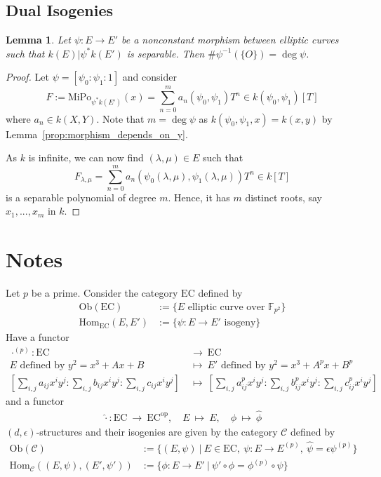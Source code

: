 \documentclass{scrartcl}
\newcommand{\F}{\mathbb{F}}
\renewcommand{\O}{O}
\newtheorem{lemma}[prop]{Lemma}
\theoremstyle{definition}
\begin{document}
\subsection{Dual Isogenies}
\begin{lemma}
    Let $\psi: E \to E'$ be a nonconstant morphism between elliptic curves such that $k(E) | \psi^*k(E')$ is separable.
    Then $\#\psi^{-1}(\{\O\}) = \deg\psi$.
\end{lemma}
\begin{proof}
    Let $\psi = [\psi_0 : \psi_1 : 1]$ and consider
    \begin{equation*}
        F := \mathrm{MiPo}_{\psi^*k(E')}(x) = \sum_{n = 0}^m a_n(\psi_0, \psi_1) T^n \in k(\psi_0, \psi_1)[T]
    \end{equation*}
    where $a_n \in k(X, Y)$.
    Note that $m = \deg\psi$ as $k(\psi_0, \psi_1, x) = k(x, y)$ by Lemma~\ref{prop:morphism_depends_on_y}.

    As $k$ is infinite, we can now find $(\lambda, \mu) \in E$ such that
    \begin{equation*}
        F_{\lambda, \mu} = \sum_{n = 0}^m a_n(\psi_0(\lambda, \mu), \psi_1(\lambda, \mu)) T^n \in k[T]
    \end{equation*}
    is a separable polynomial of degree $m$.
    Hence, it has $m$ distinct roots, say $x_1, ..., x_m$ in $k$.
\end{proof}

\section*{Notes}
Let $p$ be a prime.
Consider the category $\mathrm{EC}$ defined by
\begin{align*}
    \mathrm{Ob}(\mathrm{EC}) &:= \{ \text{$E$ elliptic curve over $\F_{p^2}$} \} \\
    \mathrm{Hom}_{\mathrm{EC}}(E, E') &:= \{ \text{$\psi: E \to E'$ isogeny} \}
\end{align*}
Have a functor
\begin{align*}
    \cdot^{(p)}: \mathrm{EC} \ &\to \ \mathrm{EC} \\
    \text{$E$ defined by $y^2 = x^3 + Ax + B$} \ &\mapsto \ \text{$E'$ defined by $y^2 = x^3 + A^p x + B^p$} \\
    \left[ \sum_{i, j} a_{ij} x^i y^j : \sum_{i, j} b_{ij} x^i y^j : \sum_{i, j} c_{ij} x^i y^j \right] \ &\mapsto \ \left[ \sum_{i, j} a_{ij}^p x^i y^j : \sum_{i, j} b_{ij}^p x^i y^j : \sum_{i, j} c_{ij}^p x^i y^j \right]
\end{align*}
and a functor
\begin{align*}
    \hat{\cdot}: \mathrm{EC} \ \to \ \mathrm{EC}^{\mathrm{op}}, \quad E \ \mapsto \ E, \quad \phi \ \mapsto \ \hat{\phi}
\end{align*}
$(d, \epsilon)$-structures and their isogenies are given by the category $\mathcal{C}$ defined by
\begin{align*}
    \mathrm{Ob}(\mathcal{C}) &:= \{ (E, \psi) \ | \ E \in \mathrm{EC}, \ \psi: E \to E^{(p)}, \ \hat{\psi} = \epsilon\psi^{(p)} \} \\
    \mathrm{Hom}_{\mathcal{C}}((E, \psi), (E', \psi')) &:= \{ \phi: E \to E' \ | \ \psi' \circ \phi = \phi^{(p)} \circ \psi \}
\end{align*}
\end{document}
